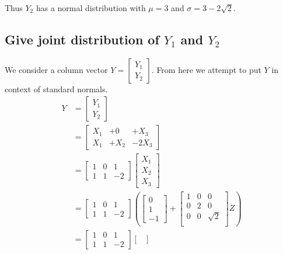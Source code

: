 \documentclass{article}
\begin{document}
Thus $Y_2$ has a normal distribution with $\mu = 3$
and $\sigma = 3 - 2\sqrt{2}$.

\subsection{Give joint distribution of $Y_1$ and $Y_2$}
We consider a column vector $Y = \begin{bmatrix} Y_1 \\ Y_2 \end{bmatrix}$.
From here we attempt to put $Y$ in context of standard normals.
\begin{align*}
    Y &= \begin{bmatrix} Y_1 \\ Y_2 \end{bmatrix} \\
    &= \begin{bmatrix} X_1 & +0 & +X_3 \\ X_1 & +X_2 & -2X_3 \end{bmatrix} \\
    &= \begin{bmatrix} 1 & 0 & 1 \\ 1 & 1 & -2 \end{bmatrix}
    \begin{bmatrix} X_1 \\ X_2 \\ X_3 \end{bmatrix} \\
    &= \begin{bmatrix} 1 & 0 & 1 \\ 1 & 1 & -2 \end{bmatrix}
    \left(
        \begin{bmatrix}
            0 \\ 1 \\ -1
        \end{bmatrix}
        +
        \begin{bmatrix}
            1 & 0 & 0 \\
            0 & 2 & 0 \\
            0 & 0 & \sqrt{2} \\
        \end{bmatrix}
        Z
    \right) \\
    &= \begin{bmatrix} 1 & 0 & 1 \\ 1 & 1 & -2 \end{bmatrix}
    \begin{bmatrix}

\end{bmatrix}
\end{align*}
\end{document}
